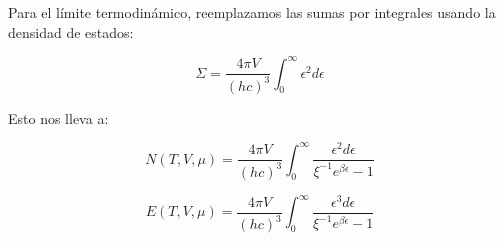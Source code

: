 
Para el límite termodinámico, reemplazamos las sumas por integrales usando la densidad de estados:

\begin{equation}\label{eq-totalestados}
\Sigma = \frac{4\pi V}{(hc)^3} \int_0^\infty \epsilon^2 d\epsilon
\end{equation}





Esto nos lleva a:

\begin{equation}\label{eq-BE-Ntotalint}
N(T,V,\mu) = \frac{4\pi V}{(hc)^3} \int_0^\infty \frac{\epsilon^2 d\epsilon}{{\xi}^{-1}e^{\beta\epsilon}-1}
\end{equation}

\begin{equation}\label{eq-BE-Etotalint}
E(T,V,\mu) = \frac{4\pi V}{(hc)^3} \int_0^\infty \frac{\epsilon^3 d\epsilon}{{\xi}^{-1}e^{\beta\epsilon}-1}
\end{equation}



